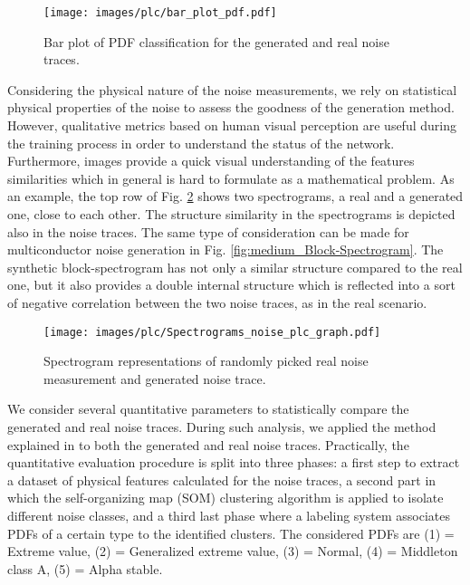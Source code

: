 \begin{figure}
	\centering
	\texttt{[image: images/plc/bar\_plot\_pdf.pdf]}
	\caption{Bar plot of PDF classification for the generated and real noise traces.}
	\label{fig:plc_Barplot}
\end{figure}

Considering the physical nature of the noise measurements,
we rely on statistical physical properties of the noise
to assess the goodness of the generation method. However,
qualitative metrics based on human visual perception are
useful during the training process in order to understand the
status of the network. Furthermore, images provide a quick
visual understanding of the features similarities which in
general is hard to formulate as a mathematical problem. As
an example, the top row of Fig. \ref{fig:plc_Spectrogram} shows two spectrograms,
a real and a generated one, close to each other. The structure
similarity in the spectrograms is depicted also in the noise
traces. The same type of consideration can be made for multiconductor noise generation in Fig. \ref{fig:medium_Block-Spectrogram}. The synthetic block-spectrogram has not only a similar structure compared to the real one, but it also provides a double internal structure which is reflected into a sort of negative correlation between the two noise traces, as in the real scenario.

\begin{figure}[t]
	\centering
	\texttt{[image: images/plc/Spectrograms\_noise\_plc\_graph.pdf]}
	\caption{Spectrogram representations of randomly picked real noise measurement and generated noise trace.}
	\label{fig:plc_Spectrogram}
\end{figure}

We consider several quantitative parameters to statistically compare the generated and real noise traces. During such analysis, we applied the method explained in \cite{righiniAutomaticClustering} to both the generated and real noise traces. Practically, the quantitative evaluation procedure is split into three phases: a first step to extract a dataset of physical features calculated for the noise traces, a second part in which the self-organizing map (SOM) clustering algorithm is applied to isolate different noise classes, and a third last phase where a labeling system associates PDFs of a certain type to the identified clusters. The considered PDFs are (1) = Extreme value, (2) = Generalized extreme value, (3) = Normal, (4) = Middleton class A, (5) = Alpha stable. 

